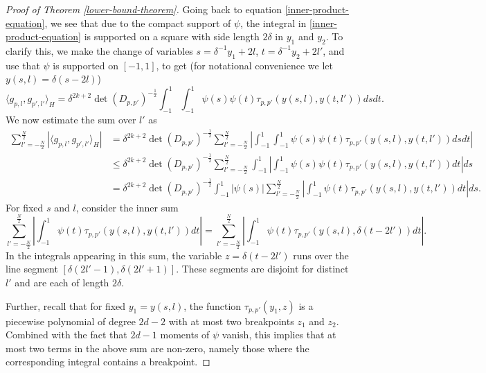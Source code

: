 \begin{proof}[Proof of Theorem \ref{lower-bound-theorem}]
 Going back to equation \eqref{inner-product-equation}, we see that due to the compact support of $\psi$, the integral in \eqref{inner-product-equation} is supported on a square with side length $2\delta$ in $y_1$ and $y_2$. To clarify this, we make the change of variables $s = \delta^{-1}y_1+2l$, $t = \delta^{-1}y_2+2l'$, and use that $\psi$ is supported on $[-1,1]$, to get (for notational convenience we let $y(s,l) = \delta (s-2l)$)
 \begin{equation}
  \langle g_{p,l}, g_{p',l'}\rangle_{H} = \delta^{2k+2}\det(D_{p,p'})^{-\frac{1}{2}} \int_{-1}^1 \int_{-1}^1 \psi(s)\psi(t) \tau_{p,p'}(y(s,l), y(t,l'))ds dt.
 \end{equation}
 We now estimate the sum over $l'$ as
  \begin{equation}\label{big-equation}
  \begin{split}
  \sum_{l'=-\frac{N}{2}}^{\frac{N}{2}} |\langle g_{p,l}, g_{p',l'}\rangle_{H}| &= \delta^{2k+2}\det(D_{p,p'})^{-\frac{1}{2}}\sum_{l'=-\frac{N}{2}}^{\frac{N}{2}}\left|\int_{-1}^1\int_{-1}^1 \psi(s)\psi(t)\tau_{p,p'}(y(s,l), y(t,l'))dsdt\right| \\
  &\leq \delta^{2k+2}\det(D_{p,p'})^{-\frac{1}{2}}\sum_{l'=-\frac{N}{2}}^{\frac{N}{2}}\int_{-1}^1\left|\int_{-1}^1 \psi(s)\psi(t)\tau_{p,p'}(y(s,l), y(t,l'))dt\right|ds \\
  & = \delta^{2k+2}\det(D_{p,p'})^{-\frac{1}{2}}\int_{-1}^1|\psi(s)|\sum_{l'=-\frac{N}{2}}^{\frac{N}{2}}\left|\int_{-1}^1 \psi(t)\tau_{p,p'}(y(s,l), y(t,l'))dt\right|ds.
  \end{split}
 \end{equation}
 For fixed $s$ and $l$, consider the inner sum
 \begin{equation}\label{sum-to-bound}
  \sum_{l'=-\frac{N}{2}}^{\frac{N}{2}}\left|\int_{-1}^1 \psi(t)\tau_{p,p'}(y(s,l), y(t,l'))dt\right| = \sum_{l'=-\frac{N}{2}}^{\frac{N}{2}}\left|\int_{-1}^1 \psi(t)\tau_{p,p'}(y(s,l), \delta (t - 2l'))dt\right|.
 \end{equation}
 In the integrals appearing in this sum, the variable $z = \delta (t - 2l')$ runs over the line segment $[\delta(2l'-1),\delta(2l'+1)]$. These segments are disjoint for distinct $l'$ and are each of length $2\delta$. 
 
 Further, recall that for fixed $y_1 = y(s,l)$, the function $\tau_{p,p'}(y_1, z)$ is a piecewise polynomial of degree $2d-2$ with at most two breakpoints $z_1$ and $z_2$. Combined with the fact that $2d-1$ moments of $\psi$ vanish, this implies that at most two terms in the above sum are non-zero, namely those where the corresponding integral contains a breakpoint.
 

\end{proof}
